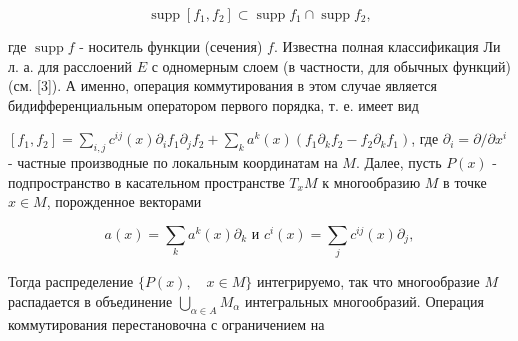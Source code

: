 \documentclass[10pt]{article}
\begin{document}
\[

\operatorname{supp}\left[f_{1}, f_{2}\right] \subset \operatorname{supp} f_{1} \cap \operatorname{supp} f_{2},

\]



где $\operatorname{supp} f$ - носитель функции (сечения) $f$. Известна полная классификация Ли л. а. для расслоений $E$ с одномерным слоем (в частности, для обычных функций) (см. [3]). А именно, операция коммутирования в этом случае является бидифференциальным оператором первого порядка, т. е. имеет вид



$\left[f_{1}, f_{2}\right]=\sum_{i, j} c^{i j}(x) \partial_{i} f_{1} \partial_{j} f_{2}+\sum_{k} a^{k}(x)\left(f_{1} \partial_{k} f_{2}-f_{2} \partial_{k} f_{1}\right)$, где $\partial_{i}=\partial / \partial x^{i}$ - частные производные по локальным координатам на $M$. Далее, пусть $P(x)$ - подпространство в касательном пространстве $T_{x} M$ к многообразию $M$ в точке $x \in M$, порожденное векторами



\[

a(x)=\sum_{k} a^{k}(x) \partial_{k} \text { и } c^{i}(x)=\sum_{j} c^{i j}(x) \partial_{j},

\]



Тогда распределение $\{P(x), \quad x \in M\}$ интегрируемо, так что многообразие $M$ распадается в объединение $\bigcup_{\alpha \in A} M_{\alpha}$ интегральных многообразий. Операция коммутирования перестановочна с ограничением на
\end{document}
